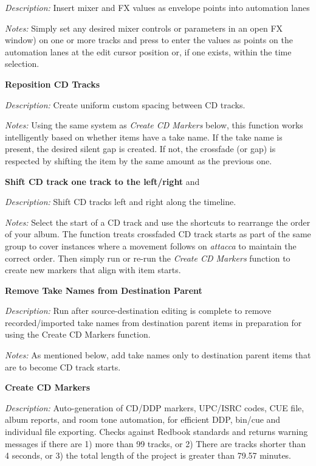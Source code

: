 \documentclass[10pt,american]{article}
\begin{document}
\emph{Description: }Insert mixer and FX values as envelope points into
automation lanes

\emph{Notes: }Simply set any desired mixer controls or parameters in an open FX
window) on one or more tracks and press  to enter the values as points
on the automation lanes at the edit cursor position or, if one exists, within
the time selection.

\textbf{Reposition CD Tracks }

\emph{Description: }Create uniform custom spacing between CD tracks.

\emph{Notes: }Using the same system as \emph{Create CD Markers} below, this
function works intelligently based on whether items have a take name. If the
take name is present, the desired silent gap is created. If not, the crossfade
(or gap) is respected by shifting the item by the same amount as the previous
one.

\textbf{Shift CD track one track to the left/right }\keys{\ctrl+\arrowkeyleft}
and \keys{\ctrl+\arrowkeyright}

\emph{Description: }Shift CD tracks left and right along the timeline.

\emph{Notes: }Select the start of a CD track and use the shortcuts to rearrange
the order of your album. The function treats crossfaded CD track starts as part
of the same group to cover instances where a movement follows on \emph{attacca
}to maintain the correct order. Then simply run or re-run the \emph{Create CD
Markers} function to create new markers that align with item starts.

\textbf{Remove Take Names from Destination Parent }

\emph{Description: }Run after source-destination editing is complete to remove
recorded/imported take names from destination parent items in preparation for
using the Create CD Markers function.

\emph{Notes: }As mentioned below, add take names only to destination parent
items that are to become CD track starts.

\textbf{Create CD Markers }

\emph{Description: }Auto-generation of CD/DDP markers, UPC/ISRC codes, CUE file,
album reports, and room tone automation, for efficient DDP, bin/cue and
individual file exporting. Checks against Redbook standards and returns warning
messages if there are 1) more than 99 tracks, or 2) There are tracks shorter
than 4 seconds, or 3) the total length of the project is greater than 79.57
minutes.
\end{document}
